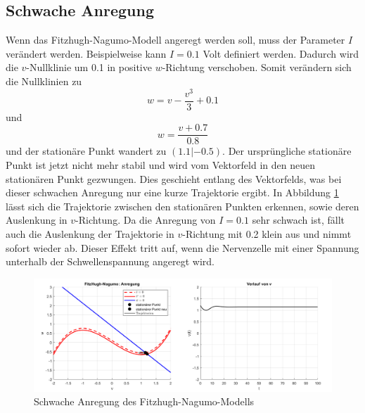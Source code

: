 \begin{refsection}
\subsection{Schwache Anregung}
Wenn das Fitzhugh-Nagumo-Modell angeregt werden soll, muss der Parameter $I$ verändert werden.
Beispielweise kann $I = 0.1$ Volt definiert werden.
Dadurch wird die $v$-Nullklinie um 0.1 in positive $w$-Richtung verschoben.
Somit verändern sich die Nullklinien zu \[ w = v - \frac{v^3}{3} + 0.1\]
und \[w = \frac{v + 0.7}{0.8}\] und der stationäre Punkt wandert zu $(1.1 |-0.5)$.
Der ursprüngliche stationäre Punkt ist jetzt nicht mehr stabil und wird vom Vektorfeld in den neuen stationären Punkt
gezwungen.
Dies geschieht entlang des Vektorfelds, was bei dieser schwachen Anregung nur eine kurze Trajektorie ergibt.
In Abbildung \ref{fig:schwacheAnregung} lässt sich die Trajektorie zwischen den stationären Punkten erkennen, sowie
deren Auslenkung in $v$-Richtung.
Da die Anregung von $I = 0.1$ sehr schwach ist, fällt auch die Auslenkung der Trajektorie in $v$-Richtung mit 0.2 klein aus und
nimmt sofort wieder ab. 
Dieser Effekt tritt auf, wenn die Nervenzelle mit einer Spannung unterhalb der Schwellenspannung angeregt wird.
\begin{figure}[h]
    \centering
    \includegraphics[width=\textwidth]{papers/nerven/Bilder/schwacheAnregung.png}
    \caption{Schwache Anregung des Fitzhugh-Nagumo-Modells}
    \label{fig:schwacheAnregung}
\end{figure}
\cite{nerven:InaLammers.31.08.2015}

\end{refsection}

